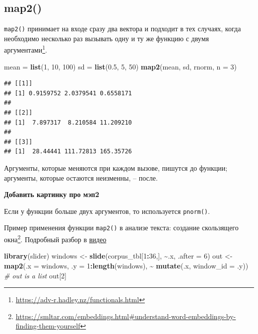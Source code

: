 \documentclass[
]{book}
\newenvironment{Shaded}{\begin{snugshade}}{\end{snugshade}}
\newcommand{\AttributeTok}[1]{\textcolor[rgb]{0.13,0.29,0.53}{#1}}
\newcommand{\CommentTok}[1]{\textcolor[rgb]{0.56,0.35,0.01}{\textit{#1}}}
\newcommand{\DecValTok}[1]{\textcolor[rgb]{0.00,0.00,0.81}{#1}}
\newcommand{\FloatTok}[1]{\textcolor[rgb]{0.00,0.00,0.81}{#1}}
\newcommand{\FunctionTok}[1]{\textcolor[rgb]{0.13,0.29,0.53}{\textbf{#1}}}
\newcommand{\NormalTok}[1]{#1}
\newcommand{\OtherTok}[1]{\textcolor[rgb]{0.56,0.35,0.01}{#1}}
\newcommand{\SpecialCharTok}[1]{\textcolor[rgb]{0.81,0.36,0.00}{\textbf{#1}}}
\theoremstyle{definition}
\theoremstyle{definition}
\theoremstyle{definition}
\theoremstyle{definition}
\theoremstyle{remark}
\begin{document}
\hypertarget{map2}{%
\subsection{map2()}\label{map2}}

\texttt{map2()} принимает на входе сразу два вектора и подходит в тех случаях, когда необходимо несколько раз вызывать одну и ту же функцию с двумя аргументами\footnote{\url{https://adv-r.hadley.nz/functionals.html}}.

\begin{Shaded}
\begin{Highlighting}[]
\NormalTok{mean }\OtherTok{=} \FunctionTok{list}\NormalTok{(}\DecValTok{1}\NormalTok{, }\DecValTok{10}\NormalTok{, }\DecValTok{100}\NormalTok{)}
\NormalTok{sd }\OtherTok{=} \FunctionTok{list}\NormalTok{(}\FloatTok{0.5}\NormalTok{, }\DecValTok{5}\NormalTok{, }\DecValTok{50}\NormalTok{)}
\FunctionTok{map2}\NormalTok{(mean, sd, rnorm, }\AttributeTok{n =} \DecValTok{3}\NormalTok{)}
\end{Highlighting}
\end{Shaded}

\begin{verbatim}
## [[1]]
## [1] 0.9159752 2.0379541 0.6558171
## 
## [[2]]
## [1]  7.897317  8.210584 11.209210
## 
## [[3]]
## [1]  28.44441 111.72813 165.35726
\end{verbatim}

Аргументы, которые меняются при каждом вызове, пишутся до функции; аргументы, которые остаются неизменны, -- после.

\textbf{Добавить картинку про мэп2}

Если у функции больше двух аргументов, то используется \texttt{pnorm()}.

Пример применения функции \texttt{map2()} в анализе текста: создание скользящего окна\footnote{\url{https://smltar.com/embeddings.html\#understand-word-embeddings-by-finding-them-yourself}}. Подробный разбор в \href{https://vk.com/video-211800158_456239215}{видео}

\begin{Shaded}
\begin{Highlighting}[]
\FunctionTok{library}\NormalTok{(slider)}
\NormalTok{windows }\OtherTok{\textless{}{-}} \FunctionTok{slide}\NormalTok{(corpus\_tbl[}\DecValTok{1}\SpecialCharTok{:}\DecValTok{36}\NormalTok{,], }\SpecialCharTok{\textasciitilde{}}\NormalTok{.x, }\AttributeTok{.after =} \DecValTok{6}\NormalTok{)}
\NormalTok{out }\OtherTok{\textless{}{-}} \FunctionTok{map2}\NormalTok{(}\AttributeTok{.x =}\NormalTok{ windows, }\AttributeTok{.y =} \DecValTok{1}\SpecialCharTok{:}\FunctionTok{length}\NormalTok{(windows), }\SpecialCharTok{\textasciitilde{}} \FunctionTok{mutate}\NormalTok{(.x, }\AttributeTok{window\_id =}\NormalTok{ .y)) }\CommentTok{\# out is a list}
\NormalTok{out[}\DecValTok{2}\NormalTok{]}
\end{Highlighting}
\end{Shaded}
\end{document}
